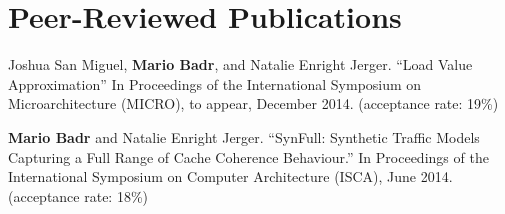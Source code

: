 \section{\sc Peer-Reviewed Publications}

Joshua San Miguel, \textbf{Mario Badr}, and Natalie Enright Jerger. 
“Load Value Approximation” 
In Proceedings of the International Symposium on Microarchitecture (MICRO), to appear, December 2014.
(acceptance rate: 19\%)

\textbf{Mario Badr} and Natalie Enright Jerger. 
“SynFull: Synthetic Traffic Models Capturing a Full Range of Cache Coherence Behaviour.” 
In Proceedings of the International Symposium on Computer Architecture (ISCA), June 2014.
(acceptance rate: 18\%)